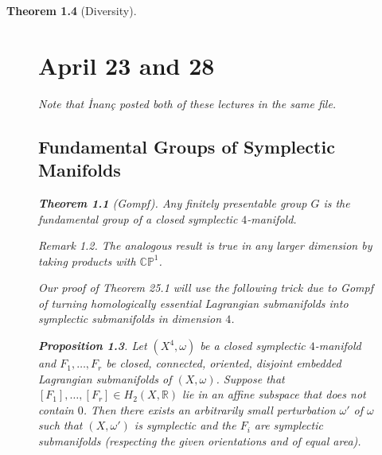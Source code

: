 \documentclass[leqno, openany]{memoir}
\newtheorem{thm}{Theorem}[chapter]
\newtheorem{prop}[thm]{Proposition}
\theoremstyle{definition}
\theoremstyle{remark}
\newtheorem{rmk}[thm]{Remark}
\theoremstyle{plain}
\theoremstyle{definition}
\theoremstyle{remark}
\newcommand{\R}{\mathbb{R}}
\newcommand{\C}{\mathbb{C}}
\renewcommand{\P}{\mathbb{P}}
\begin{document}
\begin{thm}[Diversity]
\begin{figure}[H]
    \chapter{April 23 and 28}%
    
    Note that \.Inan\c{c} posted both of these lectures in the same file.

    \section{Fundamental Groups of Symplectic Manifolds}%
    \label{sec:topology_of_symplectic_4_manifolds}
    
    \begin{thm}[Gompf] Any finitely presentable group $G$ is the fundamental
    group of a closed symplectic $4$-manifold.  \end{thm}

    \begin{rmk} The analogous result is true in any larger dimension by taking
    products with $\C\P^1$.  \end{rmk}

    Our proof of Theorem 25.1 will use the following trick due to Gompf of
    turning homologically essential Lagrangian submanifolds into symplectic
    submanifolds in dimension $4$.

    \begin{prop} Let $(X^4, \omega)$ be a closed symplectic $4$-manifold and
        $F_1, \ldots, F_r$ be closed, connected, oriented, disjoint embedded
        Lagrangian submanifolds of $(X, \omega)$. Suppose that $[F_1], \ldots,
        [F_r] \in H_2(X, \R)$ lie in an affine subspace that does not contain
        $0$. Then there exists an arbitrarily small perturbation $\omega'$ of
        $\omega$ such that $(X, \omega')$ is symplectic and the $F_i$ are
        symplectic submanifolds (respecting the given orientations and of equal
        area).  \end{prop}


\end{figure}
\end{thm}
\end{document}

